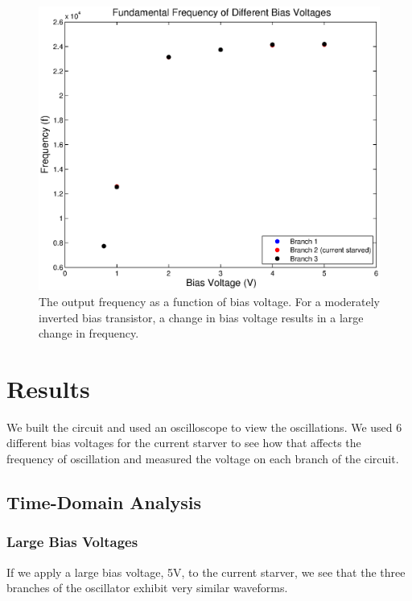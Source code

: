 \documentclass{article}
\begin{document}
\begin{figure}[H]
\centering
\includegraphics[scale=.7]{biasFrequenciesSim.eps}
\caption{The output frequency as a function of bias voltage. For a moderately inverted bias transistor, a change in bias voltage results in a large change in frequency.}
\label{biasFrequenciesSim}
\end{figure}

\section*{Results}

We built the circuit and used an oscilloscope to view the oscillations.  We used 6 different bias voltages for the current starver to see how that affects the frequency of oscillation and measured the voltage on each branch of the circuit.

\subsection*{Time-Domain Analysis}

\subsubsection*{Large Bias Voltages}

If we apply a large bias voltage, 5V, to the current starver, we see that the three branches of the oscillator exhibit very similar waveforms.
\end{document}
